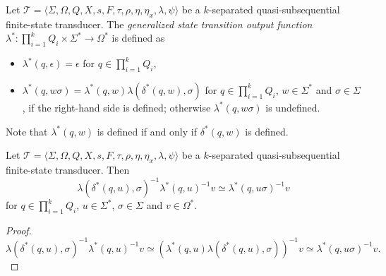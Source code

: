 \begin{definition}
  Let $\mathcal{T} = \langle \Sigma, \Omega, Q, X, s, F, \tau, \rho, \eta, \eta_x,
  \lambda, \psi \rangle$ be a $k$-separated quasi-subsequential finite-state
  transducer. The \emph{generalized state transition output function} $\lambda^* :
  \prod_{i=1}^k Q_i \times \Sigma^* \rightarrow \Omega^*$ is defined as
  \begin{itemize}
    \item $\lambda^*(q, \epsilon) = \epsilon$ for $q \in \prod_{i=1}^k Q_i$,
    \item $\lambda^*(q, w\sigma) = \lambda^*(q, w)\lambda(\delta^*(q, w), \sigma)$
	    for $q \in \prod_{i=1}^k Q_i$, $w \in \Sigma^*$ and $\sigma \in \Sigma$, if
	    the right-hand side is defined; otherwise $\lambda^*(q, w\sigma)$ is
	    undefined.
  \end{itemize}
  Note that $\lambda^*(q, w)$ is defined if and only if $\delta^*(q, w)$ is defined.
\end{definition}

\begin{proposition}
  Let $\mathcal{T} = \langle \Sigma, \Omega, Q, X, s, F, \tau, \rho, \eta, \eta_x,
  \lambda, \psi \rangle$ be a $k$-separated quasi-subsequential finite-state
  transducer. Then
  \begin{equation*}
    \lambda(\delta^*(q, u), \sigma)^{-1} \lambda^*(q, u)^{-1} v \simeq \lambda^*(q,
    u \sigma)^{-1} v
  \end{equation*}
  for $q \in \prod_{i=1}^k Q_i$, $u \in \Sigma^*$, $\sigma \in \Sigma$ and $v \in
  \Omega^*$.
\end{proposition}

\begin{proof}
  \begin{equation*}
    \lambda(\delta^*(q, u), \sigma)^{-1} \lambda^*(q, u)^{-1} v \simeq (\lambda^*(q,
    u) \lambda(\delta^*(q, u), \sigma))^{-1} v \simeq \lambda^*(q, u \sigma)^{-1} v.
  \end{equation*}
\end{proof}

